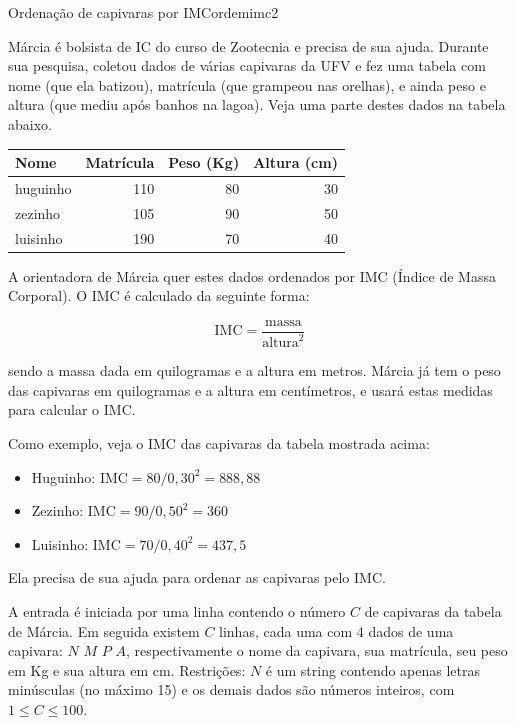 \documentclass[12pt,a4paper,oneside]{article}
\begin{document}
\begin{problem}{Ordenação de capivaras por IMC}{ordemimc}{2}

Márcia é bolsista de IC do curso de Zootecnia e precisa de sua ajuda. Durante sua pesquisa, coletou dados de várias capivaras da UFV e fez uma tabela com nome (que ela batizou), matrícula (que grampeou nas orelhas), e ainda peso e altura (que mediu após banhos na lagoa). Veja uma parte destes dados na tabela abaixo.

\begin{center}
\begin{tabular}{l|rrr}
Nome & Matrícula & Peso (Kg) & Altura (cm)\\
\hline
huguinho & 110 & 80 & 30\\
zezinho & 105 & 90 & 50\\
luisinho & 190 & 70 & 40
\end{tabular}
\end{center}

A orientadora de Márcia quer estes dados ordenados por IMC (Índice de Massa Corporal).  O IMC é calculado da seguinte forma:

$$\text{IMC} = \frac{\text{massa}}{\text{altura}^2}$$

sendo a massa dada em quilogramas e a altura em metros. Márcia já tem o peso das capivaras em quilogramas e a altura em centímetros, e usará estas medidas para calcular o IMC. 

Como exemplo, veja o IMC das capivaras da tabela mostrada acima:


\begin{itemize}
    \item Huguinho: $\text{IMC} = 80/0,30^2 = 888,88$
    \item Zezinho: $\text{IMC} = 90/0,50^2 = 360$
    \item Luisinho: $\text{IMC} = 70/0,40^2 = 437,5$
\end{itemize}


Ela precisa de sua ajuda para ordenar as capivaras pelo IMC.



\InputFile

A entrada é iniciada por uma linha contendo o número $C$ de capivaras da tabela de Márcia. Em seguida existem $C$ linhas, cada uma com 4 dados de uma capivara: $N$ $M$ $P$ $A$, respectivamente o nome da capivara, sua matrícula, seu peso em Kg e sua altura em cm. Restrições: $N$ é um string contendo apenas letras minúsculas (no máximo 15) e os demais dados são números inteiros, com $1 \leq C \leq 100$.


\end{problem}
\end{document}
